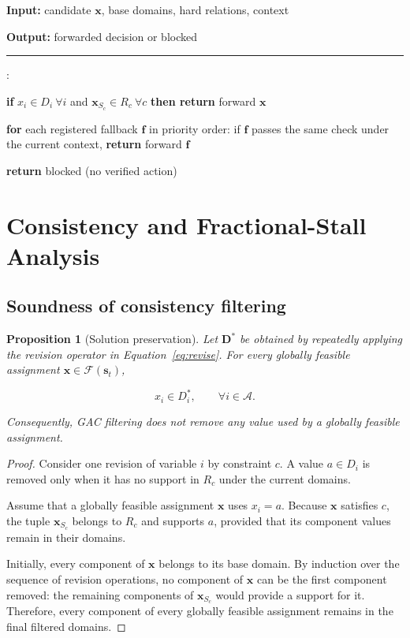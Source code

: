 \documentclass[pdflatex,sn-mathphys-num,iicol,oneside]{sn-jnl}
\newcommand{\algin}[1]{\textbf{Input:} #1\par}
\newcommand{\algout}[1]{\textbf{Output:} #1\par\vspace{2pt}\hrule\vspace{3pt}}
\newenvironment{algsteps}%
  {\begin{list}{\arabic{algstepc}:}%
     {\usecounter{algstepc}\setlength{\leftmargin}{1.6em}%
      \setlength{\itemsep}{1pt}\setlength{\parsep}{0pt}}}%
  {\end{list}}
\newcounter{algstepc}
\newtheorem{proposition}{Proposition}
\begin{document}
\begin{algorithm}[t]
\caption{Independent verification and fallback selection}
\label{alg:verify}
\small
\algin{candidate $\bm{x}$, base domains, hard relations, context}
\algout{forwarded decision or blocked}
\begin{algsteps}
\item \textbf{if} $x_i\in D_i\ \forall i$ and
$\bm{x}_{S_c}\in R_c\ \forall c$ \textbf{then return} forward $\bm{x}$
\item \textbf{for} each registered fallback $\bm{f}$ in priority order:
if $\bm{f}$ passes the same check under the current context,
\textbf{return} forward $\bm{f}$
\item \textbf{return} blocked (no verified action)
\end{algsteps}
\end{algorithm}

\section{Consistency and Fractional-Stall Analysis}
\label{sec:analysis}

\subsection{Soundness of consistency filtering}

\begin{proposition}[Solution preservation]
Let $\bm{D}^{*}$ be obtained by repeatedly applying the revision
operator in Equation~\eqref{eq:revise}. For every globally feasible
assignment $\bm{x}\in\mathcal{F}(\bm{s}_t)$,

\begin{equation}
x_i\in D_i^{*},
\qquad
\forall i\in\mathcal{A}.
\end{equation}

Consequently, GAC filtering does not remove any value used by a
globally feasible assignment.
\end{proposition}

\begin{proof}
Consider one revision of variable $i$ by constraint $c$. A value
$a\in D_i$ is removed only when it has no support in $R_c$ under the
current domains.

Assume that a globally feasible assignment $\bm{x}$ uses $x_i=a$.
Because $\bm{x}$ satisfies $c$, the tuple $\bm{x}_{S_c}$ belongs to
$R_c$ and supports $a$, provided that its component values remain in
their domains.

Initially, every component of $\bm{x}$ belongs to its base domain.
By induction over the sequence of revision operations, no component
of $\bm{x}$ can be the first component removed: the remaining
components of $\bm{x}_{S_c}$ would provide a support for it.
Therefore, every component of every globally feasible assignment
remains in the final filtered domains.
\end{proof}
\end{document}
